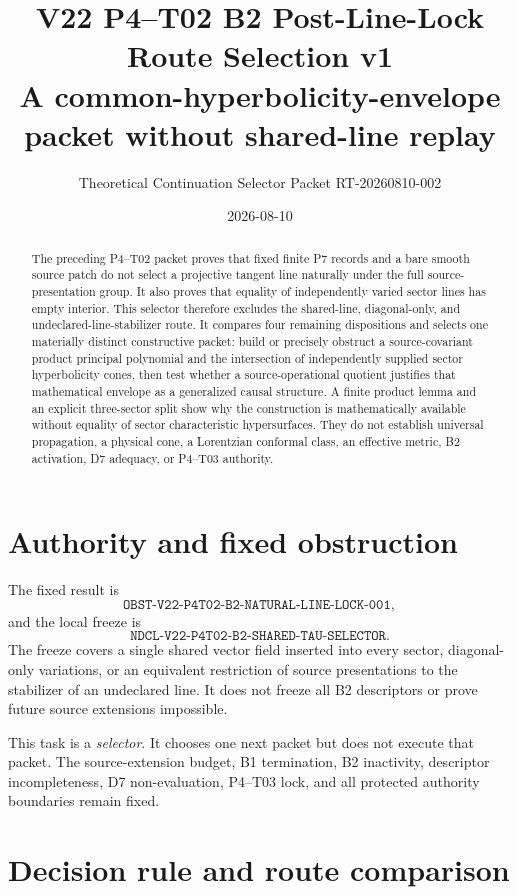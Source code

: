 \documentclass[11pt]{article}
\title{V22 P4--T02 B2 Post-Line-Lock Route Selection v1\\
\large A common-hyperbolicity-envelope packet without shared-line replay}
\author{Theoretical Continuation Selector Packet RT-20260810-002}
\date{2026-08-10}
\begin{document}
\sloppy
\maketitle

\begin{abstract}
The preceding P4--T02 packet proves that fixed finite P7 records and a bare
smooth source patch do not select a projective tangent line naturally under
the full source-presentation group.  It also proves that equality of
independently varied sector lines has empty interior.  This selector therefore
excludes the shared-line, diagonal-only, and undeclared-line-stabilizer route.
It compares four remaining dispositions and selects one materially distinct
constructive packet: build or precisely obstruct a source-covariant product
principal polynomial and the intersection of independently supplied sector
hyperbolicity cones, then test whether a source-operational quotient justifies
that mathematical envelope as a generalized causal structure.  A finite
product lemma and an explicit three-sector split show why the construction is
mathematically available without equality of sector characteristic
hypersurfaces.  They do not establish universal propagation, a physical cone,
a Lorentzian conformal class, an effective metric, B2 activation, D7 adequacy,
or P4--T03 authority.
\end{abstract}

\section{Authority and fixed obstruction}

The fixed result is
\[
 \texttt{OBST-V22-P4T02-B2-NATURAL-LINE-LOCK-001},
\]
and the local freeze is
\[
 \texttt{NDCL-V22-P4T02-B2-SHARED-TAU-SELECTOR}.
\]
The freeze covers a single shared vector field inserted into every sector,
diagonal-only variations, or an equivalent restriction of source
presentations to the stabilizer of an undeclared line.  It does not freeze all
B2 descriptors or prove future source extensions impossible.

This task is a \emph{selector}.  It chooses one next packet but does not
execute that packet.  The source-extension budget, B1 termination, B2
inactivity, descriptor incompleteness, D7 non-evaluation, P4--T03 lock, and all
protected authority boundaries remain fixed.

\section{Decision rule and route comparison}
\end{document}
